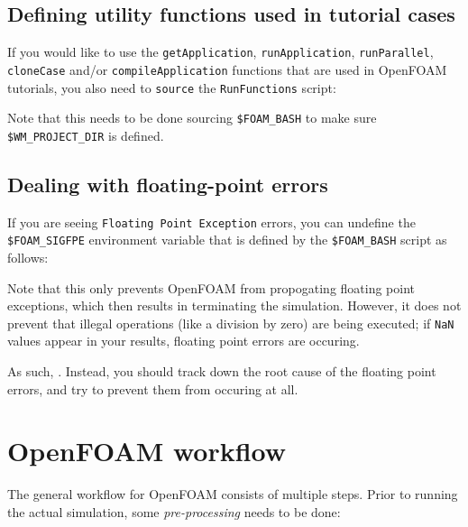 \begin{prompt}
\end{prompt}

\subsection{Defining utility functions used in tutorial cases}

If you would like to use the \lstinline|getApplication|, \lstinline|runApplication|,
\lstinline|runParallel|, \lstinline|cloneCase| and/or \lstinline|compileApplication| functions that are
used in OpenFOAM tutorials, you also need to \lstinline|source| the \lstinline|RunFunctions| script:

\begin{prompt}
\end{prompt}

Note that this needs to be done  sourcing \lstinline|$FOAM_BASH| to make sure
\lstinline|$WM_PROJECT_DIR| is defined.

\subsection{Dealing with floating-point errors}

If you are seeing \lstinline|Floating Point Exception| errors, you can undefine the
\lstinline|$FOAM_SIGFPE| environment variable that is defined by the \lstinline|$FOAM_BASH| script
as follows:

\begin{prompt}
\end{prompt}

Note that this only prevents OpenFOAM from propogating floating point exceptions, which then results in
terminating the simulation. However, it does not prevent that illegal operations (like a division by zero)
are being executed; if \lstinline|NaN| values appear in your results, floating point errors are occuring.

As such, . Instead, you should track down the root cause
of the floating point errors, and try to prevent them from occuring at all.

\section{OpenFOAM workflow}
The general workflow for OpenFOAM consists of multiple steps.
Prior to running the actual simulation, some \emph{pre-processing} needs to be done:


